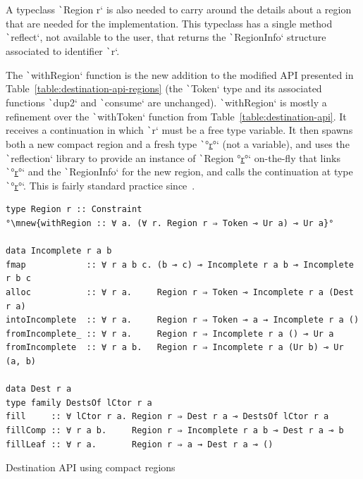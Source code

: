 \documentclass[english]{jflart}
\newcommand{\mnew}[1]{\colorbox{green!50}{#1}}
\newcommand{\muline}[1]{\uline{#1}}
\begin{document}
A typeclass \texttt`Region r` is also needed to carry around the details about a region that are needed for the implementation. This typeclass has a single method \texttt`reflect`, not available to the user, that returns the \texttt`RegionInfo` structure associated to identifier \texttt`r`.

The \texttt`withRegion` function is the new addition to the modified API presented in Table~\ref{table:destination-api-regions} (the \texttt`Token` type and its associated functions \texttt`dup2` and \texttt`consume` are unchanged). \texttt`withRegion` is mostly a refinement over the \texttt`withToken` function from Table~\ref{table:destination-api}. It receives a continuation in which \texttt`r` must be a free type variable. It then spawns both a new compact region and a fresh type \texttt`°\muline{r}°` (not a variable), and uses the \texttt`reflection` library to provide an instance of \texttt`Region °\muline{r}°` on-the-fly that links \texttt`°\muline{r}°` and the \texttt`RegionInfo` for the new region, and calls the continuation at type \texttt`°\muline{r}°`. This is fairly standard practice since~\cite{launchbury_lazy_1994}.

\begin{table}[t]
\small
\begin{verbatim}
type Region r :: Constraint
°\mnew{withRegion :: ∀ a. (∀ r. Region r ⇒ Token ⊸ Ur a) ⊸ Ur a}°

data Incomplete r a b
fmap            :: ∀ r a b c. (b ⊸ c) ⊸ Incomplete r a b ⊸ Incomplete r b c
alloc           :: ∀ r a.     Region r ⇒ Token ⊸ Incomplete r a (Dest r a)
intoIncomplete  :: ∀ r a.     Region r ⇒ Token ⊸ a → Incomplete r a ()
fromIncomplete_ :: ∀ r a.     Region r ⇒ Incomplete r a () ⊸ Ur a
fromIncomplete  :: ∀ r a b.   Region r ⇒ Incomplete r a (Ur b) ⊸ Ur (a, b)

data Dest r a
type family DestsOf lCtor r a
fill     :: ∀ lCtor r a. Region r ⇒ Dest r a ⊸ DestsOf lCtor r a
fillComp :: ∀ r a b.     Region r ⇒ Incomplete r a b ⊸ Dest r a ⊸ b
fillLeaf :: ∀ r a.       Region r ⇒ a → Dest r a ⊸ ()
\end{verbatim}
\caption{Destination API using compact regions}
\label{table:destination-api-regions}
\end{table}
\end{document}
